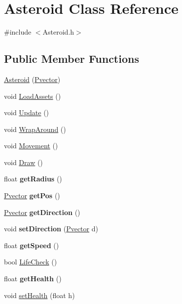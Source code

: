 \hypertarget{class_asteroid}{}\section{Asteroid Class Reference}
\label{class_asteroid}


{\ttfamily \#include $<$Asteroid.\+h$>$}

\subsection*{Public Member Functions}
\begin{DoxyCompactItemize}
\item 
\hyperlink{class_asteroid_a4894a169d3ae1dfa1b314b4aecd8ffcb}{Asteroid} (\hyperlink{class_pvector}{Pvector})
\item 
void \hyperlink{class_asteroid_a941bf4fe76b8b847cddd7e1f43aa346d}{Load\+Assets} ()
\item 
void \hyperlink{class_asteroid_a7e4a4f128d86078c8827ac9a1e015771}{Update} ()
\item 
void \hyperlink{class_asteroid_aa1e8a8317207efd5aaf905b8d55d2a02}{Wrap\+Around} ()
\item 
void \hyperlink{class_asteroid_a3c7bcc166401e873e79a7ce1dfd0e4e2}{Movement} ()
\item 
void \hyperlink{class_asteroid_af92af7c2a74de217fb7c5f78b6f6ef51}{Draw} ()
\item 
float {\bfseries get\+Radius} ()\hypertarget{class_asteroid_a7045538aaa343478dc63c38427196db5}{}\label{class_asteroid_a7045538aaa343478dc63c38427196db5}

\item 
\hyperlink{class_pvector}{Pvector} {\bfseries get\+Pos} ()\hypertarget{class_asteroid_a2b9759c6fc0619a8d71a518ef770a966}{}\label{class_asteroid_a2b9759c6fc0619a8d71a518ef770a966}

\item 
\hyperlink{class_pvector}{Pvector} {\bfseries get\+Direction} ()\hypertarget{class_asteroid_aae858268d7f844d39b608ec71971e5e2}{}\label{class_asteroid_aae858268d7f844d39b608ec71971e5e2}

\item 
void {\bfseries set\+Direction} (\hyperlink{class_pvector}{Pvector} d)\hypertarget{class_asteroid_af23ca4053790762dc930e4401245396a}{}\label{class_asteroid_af23ca4053790762dc930e4401245396a}

\item 
float {\bfseries get\+Speed} ()\hypertarget{class_asteroid_abacbb8c84d1dbbc442c16653110cab66}{}\label{class_asteroid_abacbb8c84d1dbbc442c16653110cab66}

\item 
bool \hyperlink{class_asteroid_a1c1248b2ea5c9ea0416c3f8008369684}{Life\+Check} ()
\item 
float {\bfseries get\+Health} ()\hypertarget{class_asteroid_a7feae79f96d755f2132f94d553dccaf4}{}\label{class_asteroid_a7feae79f96d755f2132f94d553dccaf4}

\item 
void \hyperlink{class_asteroid_a8009e78ee2ceeafe362752b7711604c1}{set\+Health} (float h)
\end{DoxyCompactItemize}
